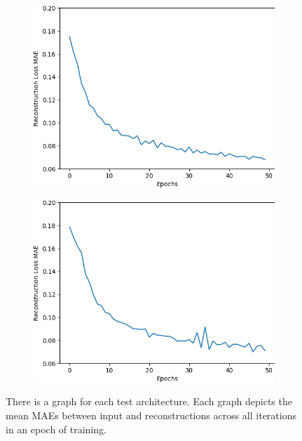 \begin{figure}[H]
\begin{subfigure}{.25\textwidth}
        \centering
        \includegraphics[width=\textwidth]
        {images/figures/experiments_architecture/mae_graphKernel3avgPool16x16x32_dim1024.png}
        \caption{}
    \end{subfigure}%
    \begin{subfigure}{.25\textwidth}
        \centering
        \includegraphics[width=\textwidth]
        {images/figures/experiments_architecture/mae_graphKernel3avgPool16x16x64_dim1024.png}
        \caption{}
    \end{subfigure}
    \caption{There is a graph for each test architecture.
    Each graph depicts the mean MAEs between input and reconstructions across all iterations in an epoch of training.}
\end{figure} \label{figure_learning_curves4}

